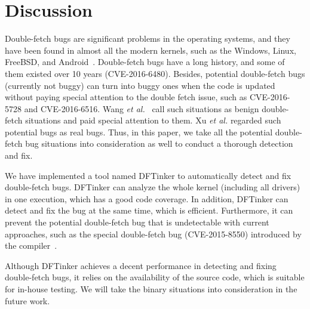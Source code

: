 \documentclass[10pt]{llncs}
\begin{document}
\section{Discussion}%
\label{discuss}

Double-fetch bugs are significant problems in the operating systems, and they have been found in almost all the modern kernels, such as the Windows, Linux, FreeBSD, and Android~\cite{wang,precise}. Double-fetch bugs have a long history, and some of them existed over 10 years (CVE-2016-6480). Besides, potential double-fetch bugs (currently not buggy) can turn into buggy ones when the code is updated without paying special attention to the double fetch issue, such as CVE-2016-5728 and CVE-2016-6516. Wang \textit{et al.}~\cite{wang} call such situations as benign double-fetch situations and paid special attention to them. Xu \textit{et al.}\cite{precise} regarded such potential bugs as real bugs. Thus, in this paper, we take all the potential double-fetch bug situations into consideration as well to conduct a thorough detection and fix.

We have implemented a tool named DFTinker to automatically detect and fix double-fetch bugs. DFTinker can analyze the whole kernel (including all drivers) in one execution, which has a good code coverage. In addition, DFTinker can detect and fix the bug at the same time, which is efficient. Furthermore, it can prevent the potential double-fetch bug that is undetectable with current approaches, such as the special double-fetch bug (CVE-2015-8550) introduced by the compiler~\cite{wilhelm15tracing}.

Although DFTinker achieves a decent performance in detecting and fixing double-fetch bugs, it relies on the availability of the source code, which is suitable for in-house testing. We will take the binary situations into consideration in the future work. 



\end{document}
